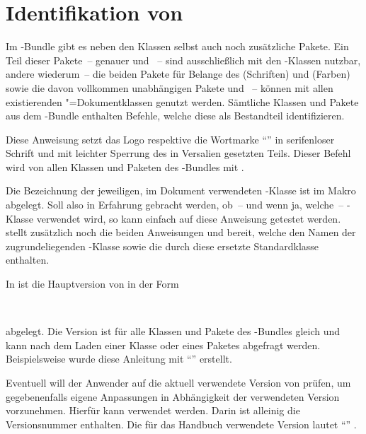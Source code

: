 \chapter{Identifikation von \TUDScript}
Im \TUDScript-Bundle gibt es neben den Klassen selbst auch noch zusätzliche 
Pakete. Ein Teil dieser Pakete~-- genauer  und 
~-- sind ausschließlich mit den \TUDScript-Klassen nutzbar, 
andere wiederum~-- die beiden Pakete für Belange des \CDs {} 
(Schriften) und  (Farben) sowie die davon vollkommen 
unabhängigen Pakete  und ~-- können mit 
allen existierenden "=Dokumentklassen genutzt werden. Sämtliche 
Klassen und Pakete aus dem \TUDScript-Bundle enthalten Befehle, welche diese 
als Bestandteil identifizieren.

\begin{Declaration}[v2.04]{}
\printdeclarationlist%
%
Diese Anweisung setzt das Logo respektive die Wortmarke \enquote{\TUDScript{}} 
in serifenloser Schrift und mit leichter Sperrung des in Versalien gesetzten 
Teils. Dieser Befehl wird von allen Klassen und Paketen des \TUDScript-Bundles 
mit .
\end{Declaration}

\begin{Declaration}[v2.04]{}
\printdeclarationlist%
%
Die Bezeichnung der jeweiligen, im Dokument verwendeten \TUDScript-Klasse ist 
im Makro  abgelegt. Soll also in Erfahrung gebracht 
werden, ob~-- und wenn ja, welche~-- \TUDScript-Klasse verwendet wird, so kann 
einfach auf diese Anweisung getestet werden. \KOMAScript{} stellt zusätzlich 
noch die beiden Anweisungen  und  
bereit, welche den Namen der zugrundeliegenden \KOMAScript-Klasse sowie die 
durch diese ersetzte Standardklasse enthalten.
\end{Declaration}

\begin{Declaration}[v2.04]{}
\begin{Declaration}[v2.05]{}
\printdeclarationlist%
%
In  ist die Hauptversion von \TUDScript in der Form
\begin{quoting}
~~
\end{quoting}
abgelegt. Die Version ist für alle Klassen und Pakete des \TUDScript-Bundles
gleich und kann nach dem Laden einer Klasse oder eines Paketes abgefragt 
werden. Beispielsweise wurde diese Anleitung mit \enquote{\TUDScriptVersion{}} 
erstellt.

Eventuell will der Anwender auf die aktuell verwendete Version von \TUDScript 
prüfen, um gegebenenfalls eigene Anpassungen in Abhängigkeit der verwendeten 
Version vorzunehmen. Hierfür kann  verwendet 
werden. Darin ist alleinig die Versionsnummer enthalten. Die für das Handbuch 
verwendete Version lautet \enquote{\TUDScriptVersionNumber{}} .
\end{Declaration}
\end{Declaration}
